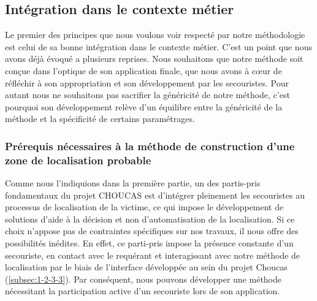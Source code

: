
\subsection{Intégration dans le contexte métier}

Le premier des principes que nous voulons voir respecté par notre
méthodologie est celui de sa bonne intégration dans le contexte
métier.
%
C'est un point que nous avons déjà évoqué a plusieurs reprises. Nous
souhaitons que notre méthode soit conçue dans l'optique de son
application finale, \ie que nous avons à cœur de réfléchir à son
appropriation et son développement par les secouristes. Pour autant
nous ne souhaitons pas sacrifier la généricité de notre méthode, c'est
pourquoi son développement relève d'un équilibre entre la généricité
de la méthode et la spécificité de certains paramétrages.

\subsubsection{Prérequis nécessaires à la méthode de construction
  d'une zone de localisation probable}
\label{sec:4-1-1-1}

Comme nous l'indiquions dans la première partie, un des partis-pris
fondamentaux du projet CHOUCAS est d'intégrer pleinement les
secouristes au processus de localisation de la victime, ce qui impose
le développement de solutions d'aide à la décision et non
d'automatisation de la localisation. Si ce choix n'appose pas de
contraintes spécifiques sur nos travaux, il nous offre des
possibilités inédites. En effet, ce parti-pris impose la présence
constante d'un secouriste, en contact avec le requérant et
interagissant avec notre méthode de localisation par le biais de
l'interface développée au sein du projet Choucas
(\ref{subsec:1-2-3-3}). Par conséquent, nous pouvons développer une
méthode nécessitant la participation active d'un secouriste lors de
son application.

